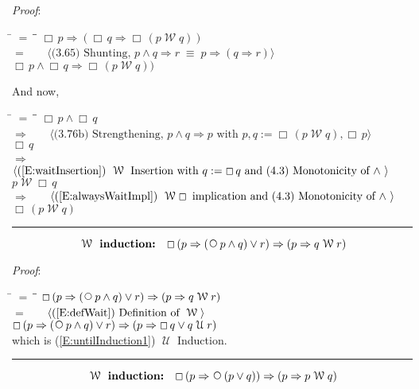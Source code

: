 \documentclass[12pt, fleqn, leqno]{article}
\newcommand{\lgap}{2pt}                             %
\newcommand{\mymathindent}{24pt}                    %
\newcommand{\equivs}{\ensuremath{\;\equiv\;}}       %
\newcommand{\impl}{\ensuremath{\Rightarrow}}        %
\newcommand{\Until}{\;\mathcal{U}\;}
\newcommand{\Wait}{\;\mathcal{W}\;}
\newcommand{\Next}{\;\,\text{\raisebox{3.5pt}{\circle{6}}}}
\newcommand{\Always}{\Box\,}
\newcommand{\myqed}{\rule[-.23ex]{1.2ex}{2.0ex}}
\newcommand{\myqedtab}{\hspace{384pt}}              %
\newcommand{\Gll} {\langle}                         %
\newcommand{\Ggg} {\rangle}                         %
\newcommand{\Hint}[1]     {\ \ \ $\Gll              \mbox{#1} \Ggg$ }   %
\begin{document}
\emph{Proof}:
\begin{tabbing}
\hspace{\mymathindent} \= $= \;$ \= \myqedtab \= \kill
  \> \>   $\Always p \impl (\Always q \impl \Always (p \Wait q))$\\[\lgap]
  \> $=$  \>  \Hint{(3.65) Shunting, $p\land q\impl r\equivs p\impl (q\impl r)$}\\[\lgap]
  \> \>   $\Always p \land \Always q \impl \Always (p \Wait q))$
\end{tabbing}
And now,
\begin{tabbing}
\hspace{\mymathindent} \= $= \;$ \= \myqedtab \= \kill
  \> \>   $\Always p \land \Always q $\\[\lgap]
  \> $\impl$ \> \Hint{(3.76b) Strengthening, $p\land q \impl p$ with $p,q := \Always (p \Wait q), \Always p$} \\[\lgap]
  \> \>   $\Always q$ \\[\lgap]
  \> $\impl$ \> \Hint{(\ref{E:waitInsertion}) $\Wait$ Insertion with $q:=\Always q$ and (4.3) Monotonicity of $\land$ } \\[\lgap]
  \> \>   $p \Wait \Always q $\\[\lgap]
   \> $\impl$ \> \Hint{(\ref{E:alwaysWaitImpl}) $\Wait\Always$ implication and (4.3) Monotonicity of $\land$  } \\[\lgap]
   \> \>   $\Always (p \Wait  q) $\quad \myqed
\end{tabbing}
\begin{equation}\label{E:waitInduct4}
\textbf{$\Wait$ induction:}\quad \Always (p \impl (\Next p\land q)\lor r) \impl (p \impl q\Wait r)
\end{equation}

\emph{Proof}:
\begin{tabbing}
\hspace{\mymathindent} \= $= \;$ \= \myqedtab \= \kill
  \> \>   $\Always (p \impl (\Next p\land q)\lor r) \impl (p \impl q\Wait r)$\\[\lgap]
  \> $=$  \>  \Hint{(\ref{E:defWait}) Definition of $\Wait$}\\[\lgap]
  \> \>   $\Always (p \impl (\Next p\land q)\lor r) \impl (p \impl \Always q\lor q\Until r)$\\[\lgap]
\> which is (\ref{E:untilInduction1}) $\Until$ Induction. \quad \myqed
\end{tabbing}
\begin{equation}\label{E:waitInduct3}
\textbf{$\Wait$ induction:}\quad \Always (p \impl \Next (p\lor q)) \impl  (p \impl p \Wait q)
\end{equation}
\end{document}
